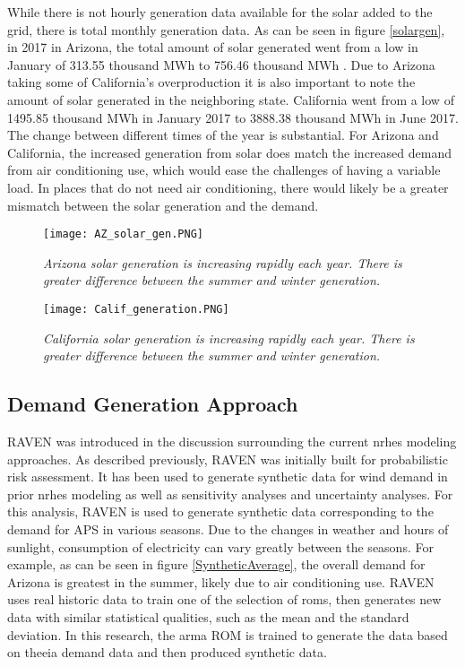While there is not hourly generation data available for the solar added to the grid, there is total monthly generation data. As can be seen in figure \ref{solargen}, in 2017 in Arizona, the total amount of solar generated went from a low in January of 313.55 thousand MWh to 756.46 thousand MWh \cite{Eia2018}.  Due to Arizona taking some of California's overproduction it is also important to note the amount of solar generated in the neighboring state.  California went from a low of 1495.85 thousand MWh in January 2017 to 3888.38 thousand MWh in June 2017\cite{Eia2018}. The change between different times of the year is substantial. For Arizona and California, the increased generation from solar does match the increased demand from air conditioning use, which would ease the challenges of having a variable load.  In places that do not need air conditioning, there would likely be a greater mismatch between the solar generation and the demand.

\begin{figure*}[t!]
    \centering
    \begin{subfigure}[b]{\textwidth}
        \centering
        \texttt{[image: AZ\_solar\_gen.PNG]}
        \caption{\small \sl Arizona solar generation is increasing rapidly each year.  There is greater difference between the summer and winter generation.}
    \end{subfigure}
     \hfill
    \begin{subfigure}[t]{\textwidth}
        \centering
        \texttt{[image: Calif\_generation.PNG]}
        \caption{\small \sl California solar generation is increasing rapidly each year.  There is greater difference between the summer and winter generation.}
    \end{subfigure}
    \hfill
    \caption{\small \sl Monthly solar generation data for Arizona and California. Data from January 2014 until April 2018 sourced from the EIA \cite{EIA2017}}
    \label{solargen}
\end{figure*}

\subsection{Demand Generation Approach}
RAVEN was introduced in the discussion surrounding the current \ac{nrhes} modeling approaches.  As described previously, RAVEN was initially built for probabilistic risk assessment.  It has been used to generate synthetic data for wind demand in prior \ac{nrhes} modeling as well as sensitivity analyses and uncertainty analyses.  For this analysis, RAVEN is used to generate synthetic data corresponding to the demand for APS in various seasons.  Due to the changes in weather and hours of sunlight, consumption of electricity can vary greatly between the seasons. For example, as can be seen in figure \ref{SyntheticAverage}, the overall demand for Arizona is greatest in the summer, likely due to air conditioning use. RAVEN uses real historic data to train one of the selection of \ac{roms}, then generates new data with similar statistical qualities, such as the mean and the standard deviation. In this research, the \ac{arma} ROM is trained  to generate the data based on the\ac{eia} demand data and then produced synthetic data.


